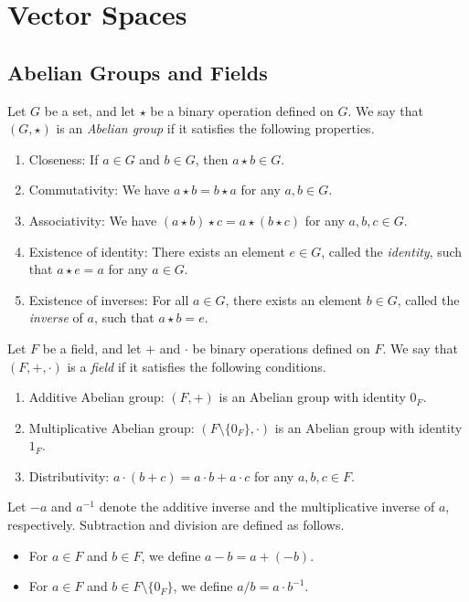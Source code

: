 \chapter{Vector Spaces}
\section{Abelian Groups and Fields}
\begin{definition}
  \label{def:abelian-group}
  Let $G$ be a set, and let $\star$ be a binary operation defined on $G$.
  We say that $(G, \star)$ is an \emph{Abelian group} if it satisfies the
  following properties.
  \begin{enumerate}[1.]
    \item Closeness: If $a \in G$ and $b \in G$, then $a \star b \in G$.
    \item Commutativity: We have $a \star b = b \star a$ for any $a, b \in G$.
    \item Associativity: We have $(a \star b) \star c = a \star (b \star c)$
    for any $a, b, c \in G$.
    \item Existence of identity: There exists an element $e \in G$, called the
    \emph{identity}, such that $a \star e = a$ for any $a \in G$.
    \item Existence of inverses: For all $a \in G$, there exists an element
    $b \in G$, called the \emph{inverse} of $a$, such that $a \star b = e$.
  \end{enumerate}
\end{definition}

\begin{definition}
  \label{def:field}
  Let $F$ be a field, and let $+$ and $\cdot$ be binary operations defined on
  $F$.
  We say that $(F, +, \cdot)$ is a \emph{field} if it satisfies the following
  conditions.
  \begin{enumerate}[1.]
    \item Additive Abelian group: $(F, +)$ is an Abelian group with identity
    $0_F$.
    \item Multiplicative Abelian group: $(F \setminus \{0_F\}, \cdot)$ is an
    Abelian group with identity $1_F$.
    \item Distributivity: $a \cdot (b + c) = a \cdot b + a \cdot c$ for any
    $a, b, c \in F$.
  \end{enumerate}
  Let $-a$ and $a^{-1}$ denote the additive inverse and the multiplicative
  inverse of $a$, respectively.
  Subtraction and division are defined as follows.
  \begin{itemize}
    \item For $a \in F$ and $b \in F$, we define $a - b = a + (-b)$.
    \item For $a \in F$ and $b \in F \setminus \{0_F\}$, we define
    $a / b = a \cdot b^{-1}$.
  \end{itemize}
\end{definition}

